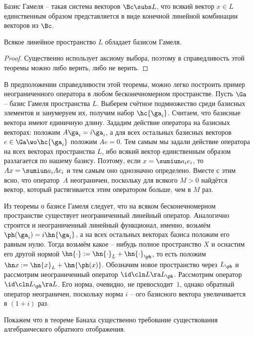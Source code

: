 \documentclass[a4paper]{article}
\begin{document}
\begin{df}
Базис Гамеля -- такая система векторов $\Bc \subs L$,
что всякий вектор $x \in L$ единственным образом представляется в виде конечной линейной комбинации
векторов из $\Bc$.
\end{df}

\begin{theorem}
Всякое линейное пространство $L$ обладает базисом Гамеля.
\end{theorem}
\begin{proof}
Существенно использует аксиому выбора, поэтому в справедливость этой теоремы
можно либо верить, либо не верить.
\end{proof}

В предположении справедливости этой теоремы, можно легко построить пример
неограниченного оператора в любом бесконечномерном пространстве. Пусть $\Ga$ --
базис Гамеля пространства $L$. Выберем счётное подмножество среди базисных элементов
и занумеруем их, получим набор $\hc{\ga_i}$. Считаем, что базисные вектора имеют единичную
длину. Зададим действие оператора на базисных векторах: положим $A\ga_i = i\ga_i$,
а для всех остальных базисных векторов $e \in \Ga \wo \hc{\ga_i}$ положим $Ae = 0$. Тем самым
мы задали действие оператора на всех векторах пространства $L$, ибо всякий вектор
единственным образом разлагается по нашему базису. Поэтому, если $x = \sumiun a_i e_i$,
то $Ax = \sumiun a_i Ae_i$ и тем самым оно однозначно определено. Вместе с этим ясно, что оператор~$A$
неограничен, поскольку для всякого $M > 0$ найдётся вектор, который растягивается этим оператором
больше, чем в $M$ раз.

\begin{ex}
Из теоремы о базисе Гамеля следует, что на всяком бесконечномерном пространстве
существует неограниченный линейный оператор.
Аналогично строится и неограниченный линейный функционал,
именно, возьмём $\ph(\ga_i) = i\hn{\ga_i}$, а на всех остальных векторах базиса положим его
равным нулю. Тогда возьмём какое -- нибудь полное пространство $X$ и оснастим его другой
нормой $\hn{\cdot} := \hn{\cdot}_L + \hn{\cdot}_\ph$, то есть
положим $\hn x := \hn{x}_L + \hm{\ph(x)}$. Обозначим новое пространство через $L_\ph$
и рассмотрим неограниченный оператор $\id\cln L \ra L_\ph$.
Рассмотрим оператор $\id\cln L_\ph \ra L$. Его норма, очевидно, не превосходит~$1$,
однако обратный оператор неограничен, поскольку норма $i$ -- ого базисного вектора
увеличивается в $(1+i)$ раз.
\end{ex}

Покажем что в теореме Банаха существенно требование существования алгебраического
обратного отображения.
\end{document}
